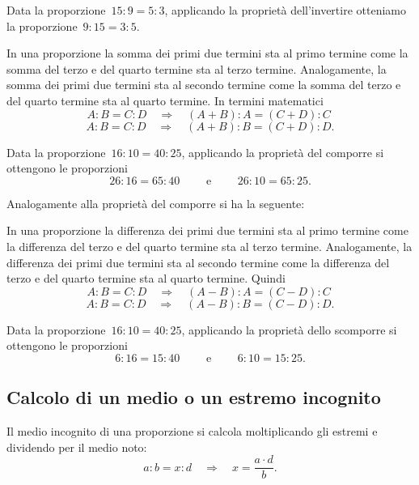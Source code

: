 \begin{exrig}
 \begin{esempio}
Data la proporzione~$15:9=5:3$, applicando la proprietà dell'invertire
otteniamo la proporzione~$9:15=3:5$.
 \end{esempio}
\end{exrig}

\begin{proprieta}
  In una proporzione la somma dei primi due termini sta al primo termine come la
somma del terzo e del quarto termine sta al terzo termine. Analogamente,
la somma dei primi due termini sta al secondo termine come la somma del terzo e del quarto
termine sta al quarto termine. In termini matematici
\[A:B=C:D\quad\Rightarrow\quad (A+B):A=(C+D):C\phantom{.}\]
\[A:B=C:D\quad\Rightarrow\quad (A+B):B=(C+D):D.\]
\end{proprieta}

\begin{exrig}
 \begin{esempio}
Data la proporzione~$16:10=40:25$, applicando la proprietà del comporre si ottengono le proporzioni
\[26:16=65:40\qquad\text{ e }\qquad26:10=65:25.\]
 \end{esempio}
\end{exrig}

Analogamente alla proprietà del comporre si ha la seguente:

\begin{proprieta}
  In una proporzione la differenza dei primi due termini sta al primo termine come la differenza del
 terzo e del quarto termine sta al terzo termine. Analogamente, la differenza dei primi due termini
sta al secondo termine come la differenza del terzo e del quarto termine sta al quarto termine. Quindi
\[A:B=C:D\quad\Rightarrow\quad (A-B):A=(C-D):C\phantom{.}\]
\[A:B=C:D\quad\Rightarrow\quad (A-B):B=(C-D):D.\]
\end{proprieta}

\begin{exrig}
 \begin{esempio}
Data la proporzione~$16:10=40:25$, applicando la proprietà dello scomporre si ottengono le proporzioni
\[6:16=15:40\qquad\text{ e }\qquad6:10=15:25.\]
 \end{esempio}
\end{exrig}

\subsection{Calcolo di un medio o un estremo incognito}
Il medio incognito di una proporzione si calcola moltiplicando gli estremi e dividendo per il medio noto:
\[a:b=x:d\quad\Rightarrow\quad x=\frac{a\cdot d}{b}.\]

